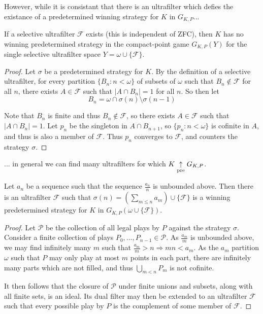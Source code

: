 However, while it is consistant that there is an ultrafilter which defies the existance of a predetermined winning strategy for $K$ in $G_{K,P}$...

\begin{proposition} 
If a selective ultrafilter $\mathcal{F}$ exists (this is independent of ZFC), then $K$ has no winning predetermined strategy in the compact-point game $G_{K,P}(Y)$ for the single selective ultrafilter space $Y=\omega \cup \{\mathcal{F}\}$.
\end{proposition}

\begin{proof}
Let $\sigma$ be a predetermined strategy for $K$. By the definition of a selective ultrafilter, for every partition $\{B_n : n < \omega\}$ of subsets of $\omega$ such that $B_n \not\in \mathcal{F}$ for all $n$, there exists $A \in \mathcal{F}$ such that $|A \cap B_n|=1$ for all $n$. So then let \[B_n = \omega \cap \sigma(n) \setminus \sigma(n-1)\]
  
Note that $B_n$ is finite and thus $B_n \not\in \mathcal{F}$, so there exists $A\in \mathcal{F}$ such that $|A \cap B_n|=1$. Let $p_n$ be the singleton in $A \cap B_{n+1}$, so $\{p_n : n < \omega\}$ is cofinite in $A$, and thus is also a member of $\mathcal{F}$. Thus $p_n$ converges to $\mathcal{F}$, and counters the strategy $\sigma$.
\end{proof}

... in general we can find many ultrafilters for which $K\underset{\text{pre}}{\uparrow} G_{K,P}$.

\begin{theorem}
Let $a_n$ be a sequence such that the sequence $\frac{a_n}{n}$ is unbounded above. Then there is an ultrafilter $\mathcal{F}$ such that $\sigma(n)=(\sum_{m\leq n} a_m )\cup \{\mathcal{F}\}$ is a winning predetermined strategy for $K$ in $G_{K,P}(\omega\cup\{\mathcal{F}\})$.
\end{theorem}

\begin{proof}
Let $\mathcal{P}$ be the collection of all legal plays by $P$ against the strategy $\sigma$. Consider a finite collection of plays $P_0,\dots,P_{n-1}\in \mathcal{P}$. As $\frac{a_m}{m}$ is unbounded above, we may find infinitely many $m$ such that $\frac{a_m}{m}>n \Rightarrow mn<a_m$. As the $a_m$ partition $\omega$ such that $P$ may only play at most $m$ points in each part, there are infinitely many parts which are not filled, and thus $\bigcup_{m<n} P_m$ is not cofinite.

It then follows that the closure of $\mathcal{P}$ under finite unions and subsets, along with all finite sets, is an ideal. Its dual filter may then be extended to an ultrafilter $\mathcal{F}$ such that every possible play by $P$ is the complement of some member of $\mathcal{F}$.
\end{proof}


